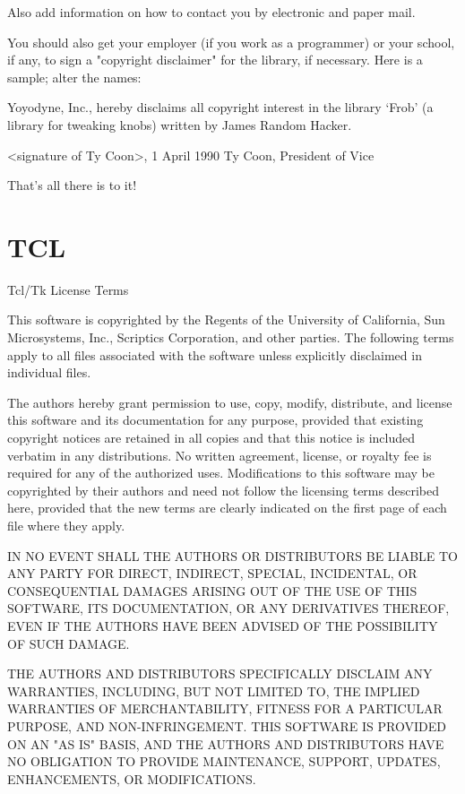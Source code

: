 \documentclass[twoside]{tceusermanual}
\begin{document}
Also add information on how to contact you by electronic and paper mail.

You should also get your employer (if you work as a programmer) or your
school, if any, to sign a "copyright disclaimer" for the library, if
necessary.  Here is a sample; alter the names:

  Yoyodyne, Inc., hereby disclaims all copyright interest in the
  library `Frob' (a library for tweaking knobs) written by James Random Hacker.

  <signature of Ty Coon>, 1 April 1990
  Ty Coon, President of Vice

That's all there is to it!

\section{TCL}

Tcl/Tk License Terms

This software is copyrighted by the Regents of the University of California, Sun Microsystems, Inc., Scriptics Corporation, and other parties. The following terms apply to all files associated with the software unless explicitly disclaimed in individual files.

The authors hereby grant permission to use, copy, modify, distribute, and license this software and its documentation for any purpose, provided that existing copyright notices are retained in all copies and that this notice is included verbatim in any distributions. No written agreement, license, or royalty fee is required for any of the authorized uses. Modifications to this software may be copyrighted by their authors and need not follow the licensing terms described here, provided that the new terms are clearly indicated on the first page of each file where they apply.

IN NO EVENT SHALL THE AUTHORS OR DISTRIBUTORS BE LIABLE TO ANY PARTY FOR DIRECT, INDIRECT, SPECIAL, INCIDENTAL, OR CONSEQUENTIAL DAMAGES ARISING OUT OF THE USE OF THIS SOFTWARE, ITS DOCUMENTATION, OR ANY DERIVATIVES THEREOF, EVEN IF THE AUTHORS HAVE BEEN ADVISED OF THE POSSIBILITY OF SUCH DAMAGE.

THE AUTHORS AND DISTRIBUTORS SPECIFICALLY DISCLAIM ANY WARRANTIES, INCLUDING, BUT NOT LIMITED TO, THE IMPLIED WARRANTIES OF MERCHANTABILITY, FITNESS FOR A PARTICULAR PURPOSE, AND NON-INFRINGEMENT. THIS SOFTWARE IS PROVIDED ON AN "AS IS" BASIS, AND THE AUTHORS AND DISTRIBUTORS HAVE NO OBLIGATION TO PROVIDE MAINTENANCE, SUPPORT, UPDATES, ENHANCEMENTS, OR MODIFICATIONS.
\end{document}
